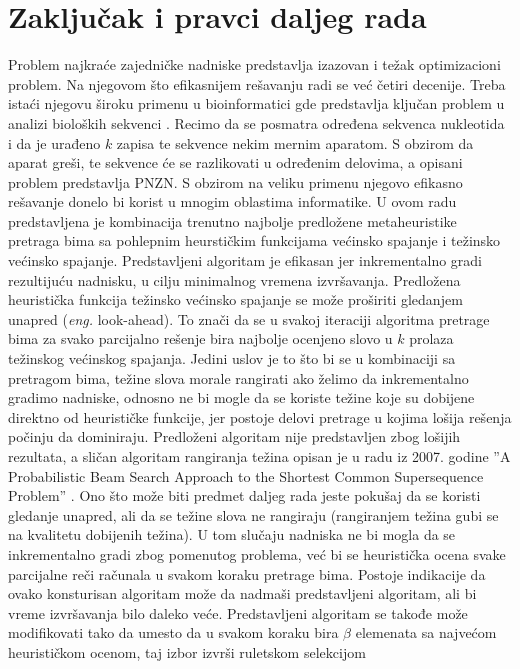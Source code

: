 \documentclass[12pt,oneside]{memoir}
\begin{document}
\chapter{Zaključak i pravci daljeg rada}
\label{chap:zakljucak}
Problem najkraće zajedničke nadniske predstavlja izazovan i težak optimizacioni problem.
Na njegovom što efikasnijem rešavanju radi se već četiri decenije.
Treba istaći njegovu široku primenu u bioinformatici gde predstavlja
ključan problem u analizi bioloških sekvenci \cite{SCSSBetterSolution}.
Recimo da se posmatra određena sekvenca nukleotida i da
je urađeno $k$ zapisa te sekvence nekim mernim aparatom.
S obzirom da aparat greši, te sekvence će se razlikovati u određenim
delovima, a opisani problem predstavlja PNZN. S obzirom na
veliku primenu njegovo efikasno rešavanje donelo bi korist u mnogim oblastima informatike.
U ovom radu predstavljena je kombinacija trenutno najbolje predložene metaheuristike
pretraga bima sa pohlepnim heurstičkim funkcijama većinsko spajanje i težinsko
većinsko spajanje. Predstavljeni algoritam je efikasan jer inkrementalno gradi rezultijuću nadnisku,
u cilju minimalnog vremena izvršavanja. Predložena heuristička funkcija težinsko većinsko
spajanje se može proširiti gledanjem unapred (\textit{eng.} look-ahead). To znači da se u svakoj
iteraciji algoritma pretrage bima za svako parcijalno rešenje bira najbolje ocenjeno slovo
u $k$ prolaza težinskog većinskog spajanja.
Jedini uslov je to što bi se u kombinaciji sa pretragom bima, težine slova
morale rangirati ako želimo da inkrementalno gradimo nadniske, odnosno ne bi mogle
da se koriste težine koje su dobijene direktno od heurističke funkcije,
jer postoje delovi pretrage u kojima lošija rešenja počinju da dominiraju.
Predloženi algoritam nije predstavljen zbog lošijih rezultata, a sličan
algoritam rangiranja težina opisan je u radu
iz 2007. godine ''A Probabilistic Beam Search Approach to the
Shortest Common Supersequence Problem'' \cite{ProbabilisticBS}.
Ono što može biti predmet daljeg rada jeste pokušaj da se koristi gledanje
unapred, ali da se težine slova ne rangiraju (rangiranjem težina gubi se
na kvalitetu dobijenih težina). U tom slučaju
nadniska ne bi mogla da se inkrementalno gradi zbog pomenutog problema,
već bi se heuristička ocena svake parcijalne reči računala
u svakom koraku pretrage bima. Postoje indikacije da ovako
konsturisan algoritam može da nadmaši predstavljeni algoritam, ali
bi vreme izvršavanja bilo daleko veće. Predstavljeni algoritam
se takođe može modifikovati tako da umesto da u svakom koraku bira $\beta$
elemenata sa najvećom heurističkom ocenom, taj izbor izvrši ruletskom selekcijom
\end{document}

